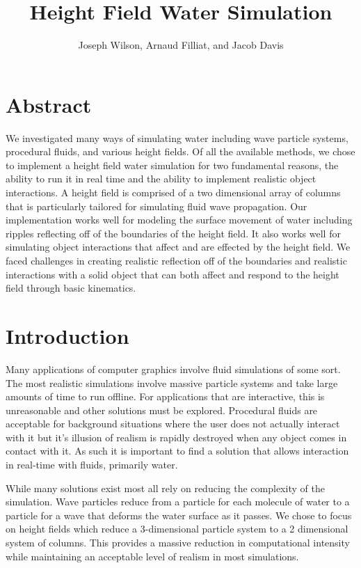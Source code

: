 \documentclass[11pt]{article}
\title{Height Field Water Simulation}
\author{Joseph Wilson, Arnaud Filliat, and Jacob Davis}
\date{\vspace{-5ex}}
\begin{document}
\maketitle

\section{Abstract}

We investigated many ways of simulating water including wave particle systems, 
procedural fluids, and various height fields. Of all the available methods, we 
chose to implement a height field water simulation for two fundamental reasons, 
the ability to run it in real time and the ability to implement realistic 
object interactions. A height field is comprised of a two dimensional array of 
columns that is particularly tailored for simulating fluid wave propagation. 
Our implementation works well for modeling the surface movement of water 
including ripples reflecting off of the boundaries of the height field. It also 
works well for simulating object interactions that affect and are effected by 
the height field. We faced challenges in creating realistic reflection off of 
the boundaries and realistic interactions with a solid object that can both 
affect and respond to the height field through basic kinematics.

\section{Introduction}

Many applications of computer graphics involve fluid simulations of some sort.  The most realistic simulations involve massive particle systems and take large amounts of time to run offline.  For applications that are interactive, this is unreasonable and other solutions must be explored.  Procedural fluids are acceptable for background situations where the user does not actually interact with it but it’s illusion of realism is rapidly destroyed when any object comes in contact with it.  As such it is important to find a solution that allows interaction in real-time with fluids, primarily water.

While many solutions exist most all rely on reducing the complexity of the 
simulation.  Wave particles reduce from a particle for each molecule of water 
to a particle for a wave that deforms the water surface as it passes.  We chose 
to focus on height fields which reduce a 3-dimensional particle system to a 2 
dimensional system of columns.  This provides a massive reduction in 
computational intensity while maintaining an acceptable level of realism in 
most simulations.
\end{document}
